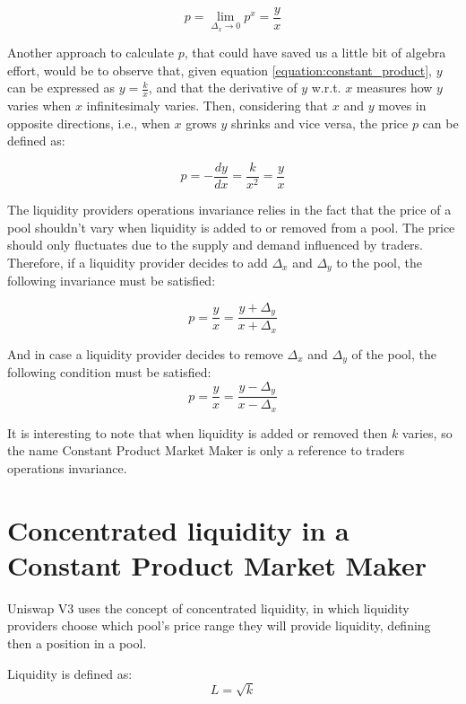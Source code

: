 \documentclass{article}
\begin{document}
\begin{equation}
    \label{equation:price}
    p=\lim_{\Delta_x \to 0}p^x=\frac{y}{x}
\end{equation}

Another approach to calculate $p$, that could have saved us a little bit of algebra effort, would be to observe that, given equation \ref{equation:constant_product}, $y$ can be expressed as $y=\frac{k}{x}$, and that the derivative of $y$ w.r.t. $x$ measures how $y$ varies when $x$ infinitesimaly varies.
Then, considering that $x$ and $y$ moves in opposite directions, i.e., when $x$ grows $y$ shrinks and vice versa, the price $p$ can be defined as:

\begin{equation}
    p=-\frac{dy}{dx}=\frac{k}{x^2}=\frac{y}{x}
\end{equation}

The liquidity providers operations invariance relies in the fact that the price of a pool shouldn't vary when liquidity is added to or removed from a pool.
The price should only fluctuates due to the supply and demand influenced by traders.
Therefore, if a liquidity provider decides to add $\Delta_x$ and $\Delta_y$ to the pool, the following invariance must be satisfied:

\begin{equation}
    p=\frac{y}{x}=\frac{y+\Delta_y}{x+\Delta_x}
\end{equation}

And in case a liquidity provider decides to remove $\Delta_x$ and $\Delta_y$ of the pool, the following condition must be satisfied:
\begin{equation}
    p=\frac{y}{x}=\frac{y-\Delta_y}{x-\Delta_x}
\end{equation}

It is interesting to note that when liquidity is added or removed then $k$ varies, so the name Constant Product Market Maker is only a reference to traders operations invariance.

\section{Concentrated liquidity in a Constant Product Market Maker}

Uniswap V3 uses the concept of concentrated liquidity, in which liquidity providers choose which pool's price range they will provide liquidity, defining then a position in a pool.

Liquidity is defined as:
\begin{equation}
    L=\sqrt{k}
\end{equation}
\end{document}
